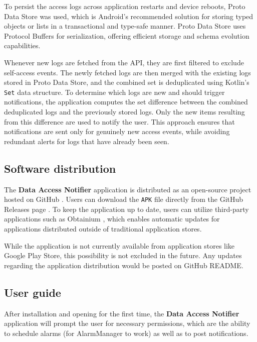 To persist the access logs across application restarts and device reboots, Proto Data Store was used, which is Android's recommended solution for storing typed objects or lists in a transactional and type-safe manner. Proto Data Store uses Protocol Buffers \cite{protocol-buffers} for serialization, offering efficient storage and schema evolution capabilities.

Whenever new logs are fetched from the API, they are first filtered to exclude self-access events. The newly fetched logs are then merged with the existing logs stored in Proto Data Store, and the combined set is deduplicated using Kotlin's \texttt{Set} data structure. To determine which logs are new and should trigger notifications, the application computes the set difference between the combined deduplicated logs and the previously stored logs. Only the new items resulting from this difference are used to notify the user. This approach ensures that notifications are sent only for genuinely new access events, while avoiding redundant alerts for logs that have already been seen.

\subsection{Software distribution}

The \textbf{Data Access Notifier} application is distributed as an open-source project hosted on GitHub \cite{data-access-notifier}. Users can download the \texttt{APK} file directly from the GitHub Releases page \cite{data-access-notifier-releases}. To keep the application up to date, users can utilize third-party applications such as Obtainium \cite{obtainium}, which enables automatic updates for applications distributed outside of traditional application stores.

While the application is not currently available from application stores like Google Play Store, this possibility is not excluded in the future. Any updates regarding the application distribution would be posted on GitHub README.

\subsection{User guide}
After installation and opening for the first time, the \textbf{Data Access Notifier} application will prompt the user for necessary permissions, which are the ability to schedule alarms (for AlarmManager to work) as well as to post notifications.

